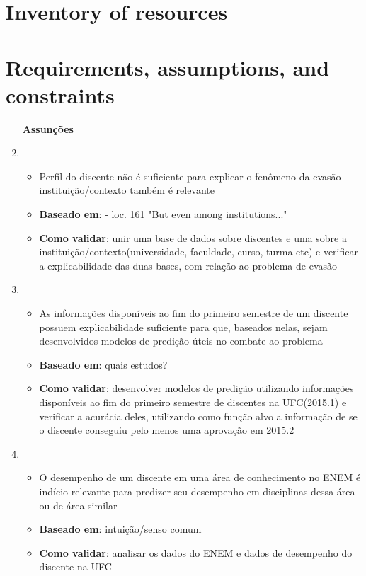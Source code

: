 \documentclass{report}
\begin{document}
\listoftodos

\tableofcontents

\chapter{Inventory of resources}

\chapter{Requirements, assumptions, and constraints}

\begin{enumerate}
\item [\textbf{Assunções}]
\item 
	\begin{itemize}
	\item Perfil do discente não é suficiente para explicar o fenômeno da evasão - instituição/contexto também é relevante
	\item \textbf{Baseado em}: \cite{tinto_leaving} - loc. 161 "But even among institutions..."
	\item \textbf{Como validar}: unir uma base de dados sobre discentes e uma sobre a instituição/contexto(universidade, faculdade, curso, turma etc) e verificar a explicabilidade das duas bases, com relação ao problema de evasão
	\end{itemize}

\item 
	\begin{itemize}
	\item As informações disponíveis ao fim do primeiro semestre de um discente possuem explicabilidade suficiente para que, baseados nelas, sejam desenvolvidos modelos de predição úteis no combate ao problema
	\item \textbf{Baseado em}: quais estudos? \cite{tinto_completing} 
	\item \textbf{Como validar}: desenvolver modelos de predição utilizando informações disponíveis ao fim do primeiro semestre de discentes na UFC(2015.1) e verificar a acurácia deles, utilizando como função alvo a informação de se o discente conseguiu pelo menos uma aprovação em 2015.2
	\end{itemize}

\item 
	\begin{itemize}
	\item O desempenho de um discente em uma área de conhecimento no ENEM é indício relevante para predizer seu desempenho em disciplinas dessa área ou de área similar
	\item \textbf{Baseado em}: intuição/senso comum
	\item \textbf{Como validar}: analisar os dados do ENEM e dados de desempenho do discente na UFC
	\end{itemize}
	

\end{enumerate}
\end{document}

